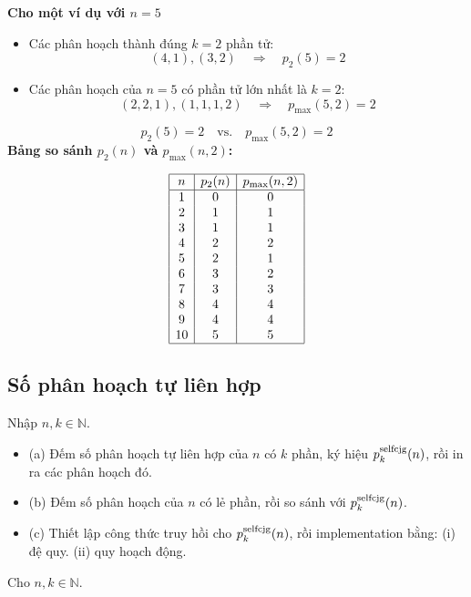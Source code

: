 \documentclass{article}
\begin{document}
	\textbf{Cho một ví dụ với $n=5$}
	
	\begin{itemize}
		\item Các phân hoạch thành đúng $k=2$ phần tử:
		\[
		(4,1), (3,2)
		\quad\Rightarrow\quad p_2(5) = 2
		\]
		\item Các phân hoạch của $n=5$ có phần tử lớn nhất là $k=2$:
		\[
		(2,2,1), (1,1,1,2)
		\quad\Rightarrow\quad p_{\max}(5,2) = 2
		\]
	\end{itemize}
	
	\[
	p_2(5) = 2 \quad\text{vs.}\quad p_{\max}(5,2) = 2
	\]
	\newpage
	\textbf{Bảng so sánh \( p_2(n) \) và \( p_{\max}(n, 2) \):}
	
	\[
	\begin{array}{|c|c|c|}
		\hline
		n & p_2(n) & p_{\max}(n, 2) \\
		\hline
		1 & 0 & 0 \\
		2 & 1 & 1 \\
		3 & 1 & 1 \\
		4 & 2 & 2 \\
		5 & 2 & 1 \\
		6 & 3 & 2 \\
		7 & 3 & 3 \\
		8 & 4 & 4 \\
		9 & 4 & 4 \\
		10 & 5 & 5 \\
		\hline
	\end{array}
	\]
	
	\subsection*{Số phân hoạch tự liên hợp}
	 Nhập $n,k\in\mathbb{N}$. 
	 \begin{itemize}
	 	\item (a) Đếm số phân hoạch tự liên hợp của $n$ có $k$ phần, ký hiệu $p_k^{\rm selfcjg}(n)$, rồi in ra các phân hoạch đó.
	 	\item (b) Đếm số phân hoạch của $n$ có lẻ phần, rồi so sánh với $p_k^{\rm selfcjg}(n)$.
	 	\item (c) Thiết lập công thức truy hồi cho $p_k^{\rm selfcjg}(n)$, rồi implementation bằng: (i) đệ quy. (ii) quy hoạch động.
	 \end{itemize}
	   
	Cho $n,k\in\mathbb{N}$.
	
\end{document}
